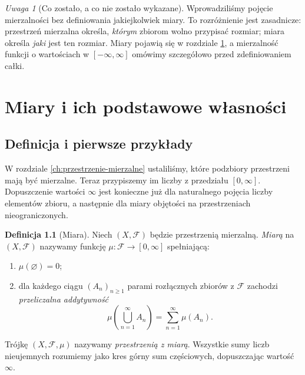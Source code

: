 \documentclass[11pt,a4paper,oneside]{book}
\numberwithin{equation}{chapter}
\theoremstyle{plain}
\theoremstyle{definition}
\newtheorem{definicja}[twierdzenie]{Definicja}
\theoremstyle{remark}
\newtheorem{uwaga}[twierdzenie]{Uwaga}
\begin{document}
\begin{uwaga}[Co zostało, a co nie zostało wykazane]
Wprowadziliśmy pojęcie mierzalności bez definiowania jakiejkolwiek
miary. To rozróżnienie jest zasadnicze: przestrzeń mierzalna określa,
\emph{którym} zbiorom wolno przypisać rozmiar; miara określa
\emph{jaki} jest ten rozmiar. Miary pojawią się w rozdziale
\ref{ch:miary-wlasnosci}, a mierzalność funkcji o wartościach
w $[-\infty,\infty]$ omówimy szczegółowo przed zdefiniowaniem całki.
\end{uwaga}



\chapter{Miary i ich podstawowe własności}
\label{ch:miary-wlasnosci}

\section{Definicja i pierwsze przykłady}

W rozdziale \ref{ch:przestrzenie-mierzalne} ustaliliśmy, które podzbiory
przestrzeni mają być mierzalne. Teraz przypiszemy im liczby z przedziału
$[0,\infty]$. Dopuszczenie wartości $\infty$ jest konieczne już dla
naturalnego pojęcia liczby elementów zbioru, a następnie dla miary
objętości na przestrzeniach nieograniczonych.

\begin{definicja}[Miara]
\label{def:measure}
Niech $(X,\mathcal F)$ będzie przestrzenią mierzalną.
\emph{Miarą} na $(X,\mathcal F)$ nazywamy funkcję
$\mu:\mathcal F\to[0,\infty]$ spełniającą:
\begin{enumerate}
\item $\mu(\varnothing)=0$;
\item dla każdego ciągu $(A_n)_{n\geq1}$ parami rozłącznych zbiorów
z $\mathcal F$ zachodzi \emph{przeliczalna addytywność}
\begin{equation}
\label{eq:countable-additivity}
\mu\left(\bigcup_{n=1}^{\infty}A_n\right)
=\sum_{n=1}^{\infty}\mu(A_n).
\end{equation}
\end{enumerate}
Trójkę $(X,\mathcal F,\mu)$ nazywamy \emph{przestrzenią z miarą}.
Wszystkie sumy liczb nieujemnych rozumiemy jako kres górny sum
częściowych, dopuszczając wartość $\infty$.
\end{definicja}
\end{document}
